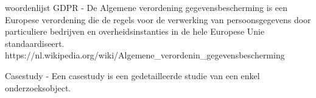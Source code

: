 \newpage
\bigskip
\bigskip
woordenlijst
GDPR - De Algemene verordening gegevensbescherming is een Europese verordening die de regels voor de verwerking van
persoonsgegevens door particuliere bedrijven en overheidsinstanties in de hele Europese Unie standaardiseert.
https://nl.wikipedia.org/wiki/Algemene\_verordenin\_gegevensbescherming

Casestudy - Een casestudy is een gedetailleerde studie van een enkel onderzoeksobject.

